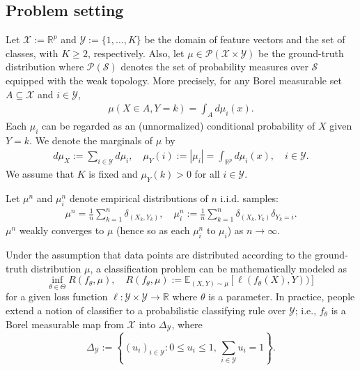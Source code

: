 \documentclass{amsart}
\theoremstyle{plain}
\numberwithin{equation}{section}\newtheorem{theorem}{Theorem}[section]
\theoremstyle{remark}
\newcommand{\X}{\mathcal{X}}
\begin{document}
\subsection{Problem setting}
\label{sec:proset}
Let $\mathcal{X}:=\mathbb{R}^p$ and $\mathcal{Y}:=\{1, \dots, K\}$ be the domain of feature vectors and the set of classes, with $K \geq 2$, respectively. Also, let $\mu \in \mathcal{P}(\mathcal{X} \times \mathcal{Y})$ be the ground-truth distribution where $\mathcal{P}(\mathcal{S})$ denotes the set of probability measures over $\mathcal{S}$ equipped with the weak topology.  More precisely, for any Borel measurable set $A \subseteq \mathcal{X}$ and $i \in \mathcal{Y}$,
\begin{align}\label{eq:mui0}
    \mu(X \in A, Y=k) = \int_{A}  d\mu_i(x).
\end{align}
Each $\mu_i$ can be regarded as an (unnormalized) conditional probability of $X$ given $Y=k$. We denote the marginals of $\mu$ by
\begin{align}
\label{eq:marg}
    d\mu_X := \sum_{i\in\mathcal Y} d\mu_i,
    \quad
    \mu_Y(i) := |\mu_i|
    = \int_{\mathbb R^p} d\mu_i(x),
    \quad i\in\mathcal Y.
\end{align}
We assume that $K$ is fixed and $\mu_Y(k)> 0$ for all $i \in \mathcal{Y}$.




Let $\mu^n$ and $\mu_i^n$ denote empirical distributions of $n$ i.i.d. samples:
\begin{align}
\label{eq:empdis}
    \mu^n = \frac{1}{n} \sum_{k=1}^n \delta_{(X_k, Y_k)}, \quad \mu_i^n := \frac{1}{n} \sum_{k=1}^n \delta_{(X_k, Y_k)} \delta_{Y_k=i}.
\end{align}
$\mu^n$ weakly converges to $\mu$ (hence so as each $\mu_i^n$ to $\mu_i$) as $n \to \infty$. 







Under the assumption that data points are distributed according to the ground-truth distribution $\mu$, a classification problem can be mathematically modeled as
\begin{equation}\label{eq:risk0}
    \inf_{\theta \in \Theta} R(f_\theta, \mu), \quad R(f_\theta, \mu):=\mathbb{E}_{(X,Y) \sim \mu} [\ell (f_\theta(X), Y)) ]
\end{equation} 
for a given loss function $\ell: \mathcal{Y} \times \mathcal{Y} \rightarrow \mathbb{R}$ where $\theta$ is a parameter. In practice, people extend a notion of classifier to a probabilistic classifying rule over $\mathcal{Y}$; i.e., $f_\theta$ is a Borel measurable map from $\X$ into $\Delta_{\mathcal{Y}}$, where
\[
    \Delta_{\mathcal{Y}} := \left\{ (u_i)_{i \in \mathcal{Y}} : 0 \leq u_i \leq 1, \, \sum_{i \in \mathcal{Y}} u_i = 1 \right\}.
\]
\end{document}
